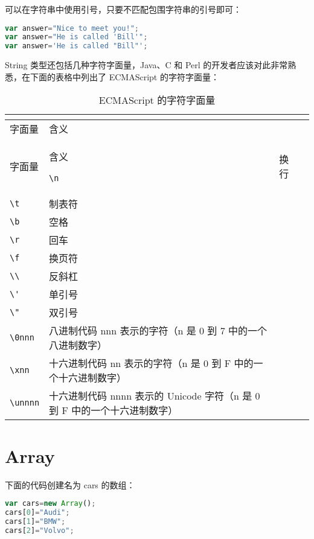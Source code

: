 可以在字符串中使用引号，只要不匹配包围字符串的引号即可：


\begin{lstlisting}[language=JavaScript]
var answer="Nice to meet you!";
var answer="He is called 'Bill'";
var answer='He is called "Bill"';
\end{lstlisting}




String 类型还包括几种字符字面量，Java、C 和 Perl 的开发者应该对此非常熟悉，在下面的表格中列出了 ECMAScript 的字符字面量：

\begin{longtable}{|m{50pt}|m{300pt}|}
\tabularnewline\hline
字面量	&含义
\endhead

\caption{ECMAScript 的字符字面量}\\
\hline
字面量	&含义
\endfirsthead

\endfoot

\endlastfoot

\hline
\verb|\n|	&换行\\
\hline
\verb|\t|	&制表符\\
\hline
\verb|\b|	&空格\\
\hline
\verb|\r|	&回车\\
\hline
\verb|\f|	&换页符\\
\hline
\verb|\\|	&反斜杠\\
\hline
\verb|\'|	&单引号\\
\hline
\verb|\"|	&双引号\\
\hline
\verb|\0nnn|	&八进制代码 nnn 表示的字符（n 是 0 到 7 中的一个八进制数字）\\
\hline
\verb|\xnn|	&十六进制代码 nn 表示的字符（n 是 0 到 F 中的一个十六进制数字）\\
\hline
\verb|\unnnn|	&十六进制代码 nnnn 表示的 Unicode 字符（n 是 0 到 F 中的一个十六进制数字）\\
\hline

\end{longtable}



\section{Array}

下面的代码创建名为 cars 的数组：

\begin{lstlisting}[language=JavaScript]
var cars=new Array();
cars[0]="Audi";
cars[1]="BMW";
cars[2]="Volvo";
\end{lstlisting}

